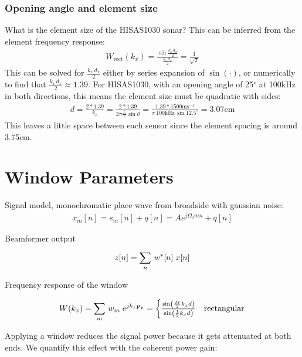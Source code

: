 \subsubsection{Opening angle and element size}

What is the element size of the HISAS1030 sonar? This can be inferred from the element frequency response:
%
\begin{align}
W_\text{rect}(k_x) = \frac{\sin\frac{k_x\,d_x}{2}}{\frac{k_x\,d_x}{2}} = \frac{1}{\sqrt{2}}
\end{align}
%
This can be solved for $\frac{k_x\,d_x}{2}$ either by series expansion of $\sin(\cdot)$, or numerically to find that $\frac{k_x\,d_x}{2} \approx 1.39$. For HISAS1030, with an opening angle of 25$^\circ$ at 100kHz in both directions, this means the element size must be quadratic with sides:
%
\begin{align}
d = \frac{2*1.39}{k_x} = \frac{2*1.39}{2\pi \frac{f_c}{c}\sin\theta} = \frac{1.39*1500\text{ms}^{-1}}{\pi\, 100\text{kHz}\,\sin{12.5^\circ}} = 3.07\text{cm}
\end{align}
%
This leaves a little space between each sensor since the element spacing is around 3.75cm.

\newpage
\section{Window Parameters}

Signal model, monochromatic place wave from broadside with gaussian noise:
\begin{align}
x_m[n] = s_m[n] + q[n] = Ae^{j\Omega_0mn} + q[n]
\end{align}

Beamformer output
\begin{align}
z[n] = \sum\limits_{n}^{}\, w^*[n]\;x[n]
\end{align}

Frequency response of the window

\begin{align}
W(k_x) = \sum\limits_{m}^{}\, w_m\;e^{jk_x \boldsymbol{p}_x} =
\begin{cases}
\frac{\sin\left(\frac{M}{2}k_x d\right)}{\sin\left(\frac{1}{2}k_x d\right)} & \text{rectangular}                                         
\end{cases}
\end{align}

Applying a window reduces the signal power because it gets attenuated at both ends. We quantify this effect with the coherent power gain:

